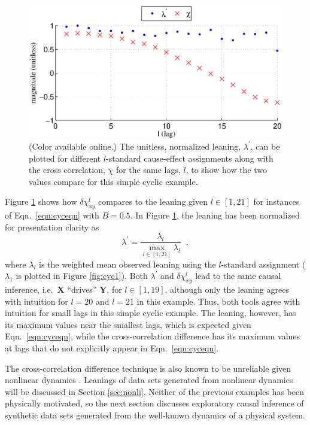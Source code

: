 \documentclass[twocolumn,aps,pre,groupedaddress]{revtex4-1}
\begin{document}
\begin{figure}[ht]
\includegraphics[scale=0.40]{SimpleCyclicexample_difflags.eps}
\caption{(Color available online.) The unitless, normalized leaning, $\lambda^\prime$, can be plotted for different $l$-standard cause-effect assignments along with the cross correlation, $\chi$ for the same lags, $l$, to show how the two values compare for this simple cyclic example.}
\label{fig:cyc2}
\end{figure}
Figure \ref{fig:cyc2} shows how $\delta\chi_{xy}^l$ compares to the leaning given $l\in[1,21]$ for instances of Eqn.\ \ref{eqn:cyceqn} with $B=0.5$.  In Figure \ref{fig:cyc2}, the leaning has been normalized for presentation clarity as
\begin{equation}
\lambda^\prime = \frac{\lambda_l}{\max_{l\in[1,21]} \lambda_l}\;\;,
\end{equation}
where $\lambda_l$ is the weighted mean observed leaning using the $l$-standard assignment ($\lambda_1$ is plotted in Figure \ref{fig:cyc1}).  Both $\lambda^\prime$ and $\delta\chi_{xy}^l$ lead to the same causal inference, i.e.\ $\mathbf{X}$ ``drives'' $\mathbf{Y}$, for $l\in[1,19]$, although only the leaning agrees with intuition for $l=20$ and $l=21$ in this example.  Thus, both tools agree with intuition for small lags in this simple cyclic example.  The leaning, however, has its maximum values near the smallest lags, which is expected given Eqn.\ \ref{eqn:cyceqn}, while the cross-correlation difference has its maximum values at lags that do not explicitly appear in Eqn.\ \ref{eqn:cyceqn}.  

The cross-correlation difference technique is also known to be unreliable given nonlinear dynamics \cite{Rogosa1980}.  Leanings of data sets generated from nonlinear dynamics will be discussed in Section \ref{sec:nonli}.  Neither of the previous examples has been physically motivated, so the next section discusses exploratory causal inference of synthetic data sets generated from the well-known dynamics of a physical system.  
\end{document}

